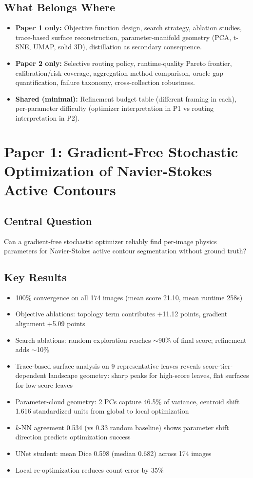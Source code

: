 \documentclass[11pt,a4paper]{article}
\begin{document}
\subsection{What Belongs Where}

\begin{itemize}
\item \textbf{Paper 1 only:} Objective function design, search strategy, ablation studies, trace-based surface reconstruction, parameter-manifold geometry (PCA, t-SNE, UMAP, solid 3D), distillation as secondary consequence.
\item \textbf{Paper 2 only:} Selective routing policy, runtime-quality Pareto frontier, calibration/risk-coverage, aggregation method comparison, oracle gap quantification, failure taxonomy, cross-collection robustness.
\item \textbf{Shared (minimal):} Refinement budget table (different framing in each), per-parameter difficulty (optimizer interpretation in P1 vs routing interpretation in P2).
\end{itemize}

\section{Paper 1: Gradient-Free Stochastic Optimization of Navier-Stokes Active Contours}

\subsection{Central Question}
Can a gradient-free stochastic optimizer reliably find per-image physics parameters for Navier-Stokes active contour segmentation without ground truth?

\subsection{Key Results}
\begin{itemize}
\item 100\% convergence on all 174 images (mean score 21.10, mean runtime 258s)
\item Objective ablations: topology term contributes +11.12 points, gradient alignment +5.09 points
\item Search ablations: random exploration reaches $\sim$90\% of final score; refinement adds $\sim$10\%
\item Trace-based surface analysis on 9 representative leaves reveals score-tier-dependent landscape geometry: sharp peaks for high-score leaves, flat surfaces for low-score leaves
\item Parameter-cloud geometry: 2 PCs capture 46.5\% of variance, centroid shift 1.616 standardized units from global to local optimization
\item $k$-NN agreement 0.534 (vs 0.33 random baseline) shows parameter shift direction predicts optimization success
\item UNet student: mean Dice 0.598 (median 0.682) across 174 images
\item Local re-optimization reduces count error by 35\%
\end{itemize}
\end{document}

